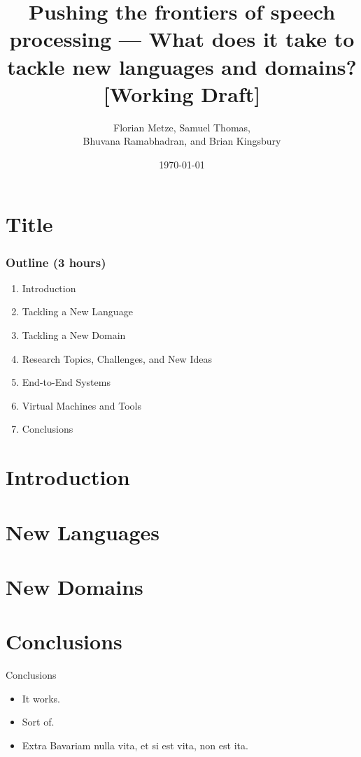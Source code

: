 \documentclass[12pt,xcolor=dvipsnames]{beamer}
\author{Florian Metze, Samuel Thomas, \\
  Bhuvana Ramabhadran, and Brian Kingsbury}
\title{{\color{Maroon} Pushing the frontiers of speech processing --- What does it take to tackle new languages and domains? [Working Draft]}}
\institute{Carnegie Mellon University and IBM}
\date{\today}
\begin{document}
\section{Title}

\begin{frame}
  \titlepage
\end{frame}



\begin{frame}
  \frametitle{Outline (3 hours)}
  \begin{enumerate}
  \item Introduction
  \item Tackling a New Language
  \item Tackling a New Domain
  \item Research Topics, Challenges, and New Ideas
  \item End-to-End Systems
  \item Virtual Machines and Tools
  \item Conclusions
  \end{enumerate}
\end{frame}

\section{Introduction}


\section{New Languages}


\section{New Domains}




\section{Conclusions}
\begin{frame}{Conclusions}
  \begin{itemize}
  \item It works.
  \item Sort of.
  \item Extra Bavariam nulla vita, et si est vita, non est ita.
  \end{itemize}
\end{frame}
\end{document}

